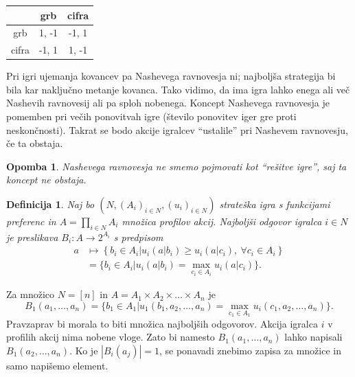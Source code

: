 \documentclass[10pt, a4paper]{article}
\newtheorem{defi}[izr]{Definicija}
\newenvironment{noticeB}{%
  \tcolorbox[%
  notitle,
  empty,
  enhanced,  %
  breakable,
  coltext=black,
  colback=white, 
  fontupper=\rmfamily,
  noparskip,
  sharp corners,
  boxrule=-1pt,  %
  frame hidden,
  left=7pt,  %
  right=7pt,
  top=5pt,
  bottom=5pt,
  before skip=2.5ex plus 2pt,
  after skip=2.5ex plus 2pt,
  borderline west = {1.5pt}{-0.1pt}{blue!30!black}, %
  overlay unbroken and last={%
    \draw[color=black, line width=1.25pt]
    ($(frame.south west)+(1.pt, -0.1pt)$) -- ++(2em, 0);
  }
  ]}
{\endtcolorbox}
\newenvironment{definicija}{\begin{noticeB}\begin{defi}}{%
    \end{defi}\end{noticeB}}
\newtheorem*{opomba}{Opomba}
\begin{document}
\begin{center}
    {\begin{tabular}{c|c|c|}
        & \textrm{grb} & \textrm{cifra}\\
        \hline
        \textrm{grb} & 1, -1 & -1, 1\\
        \hline
        \textrm{cifra} & -1, 1 & 1, -1\\
        \hline
    \end{tabular}}        
\end{center}

Pri igri ujemanja kovancev pa Nashevega ravnovesja ni; najboljša strategija bi bila kar naključno metanje kovanca. Tako vidimo,
da ima igra lahko enega ali več Nashevih ravnovesij ali pa sploh nobenega.
Koncept Nashevega ravnovesja je pomemben pri večih ponovitvah igre (število ponovitev iger gre proti neskončnosti).
Takrat se bodo akcije igralcev "`ustalile"' pri Nashevem ravnovesju, če ta obstaja.

\begin{opomba}
  Nashevega ravnovesja ne smemo pojmovati kot "`rešitve igre"', saj ta koncept ne obstaja.
\end{opomba}

\begin{definicija}
  Naj bo $(N, (A_i)_{i \in N}, (u_i)_{i \in N})$ strateška igra s funkcijami preferenc in
  $A = \prod_{i \in N} A_i$ množica profilov akcij. Najboljši odgovor igralca $i \in N$
  je preslikava $B_i: A \to 2^{A_i}$ s predpisom 
  \begin{align*}
    a &\mapsto \left\lbrace b_i \in A_i \big| u_i (a | b_i) \geq u_i (a | c_i),\ \forall c_i \in A_i \right\rbrace\\
    &= \{b_i \in A_i \big| u_i (a | b_i) = \max_{c_i \in A_i} u_i (a | c_i)\}.
  \end{align*}
\end{definicija}

Za množico $N = [n]$ in $A = A_1 \times A_2 \times \dots \times A_n$ je 
$$B_1 (a_1, \dots, a_n) = \{b_1 \in A_1 \big| u_1 (b_1, a_2, \dots, a_n) = \max_{c_1 \in A_1} u_i (c_1, a_2, \dots, a_n)\}.$$
Pravzaprav bi morala to biti množica najboljših odgovorov.
Akcija igralca $i$ v profilih akcij nima nobene vloge. Zato bi namesto 
$B_1(a_1, \dots, a_n)$ lahko napisali $B_1(a_2, \dots, a_n)$.
Ko je $|B_i (a_j)| = 1$, se ponavadi znebimo zapisa za množice in samo napišemo element.
\end{document}
